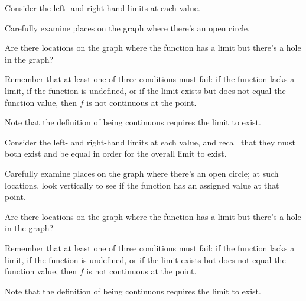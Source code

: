 \begin{smallhint}
\ba
	\item Consider the left- and right-hand limits at each value.
	\item Carefully examine places on the graph where there's an open circle.
	\item Are there locations on the graph where the function has a limit but there's a hole in the graph?
	\item Remember that at least one of three conditions must fail: if the function lacks a limit, if the function is undefined, or if the limit exists but does not equal the function value, then $f$ is not continuous at the point.
	\item Note that the definition of being continuous requires the limit to exist.
\ea
\end{smallhint}
\begin{bighint}
\ba
	\item Consider the left- and right-hand limits at each value, and recall that they must both exist and be equal in order for the overall limit to exist.
	\item Carefully examine places on the graph where there's an open circle; at such locations, look vertically to see if the function has an assigned value at that point.
	\item Are there locations on the graph where the function has a limit but there's a hole in the graph?
	\item Remember that at least one of three conditions must fail: if the function lacks a limit, if the function is undefined, or if the limit exists but does not equal the function value, then $f$ is not continuous at the point.
	\item Note that the definition of being continuous requires the limit to exist.
\ea
\end{bighint}
